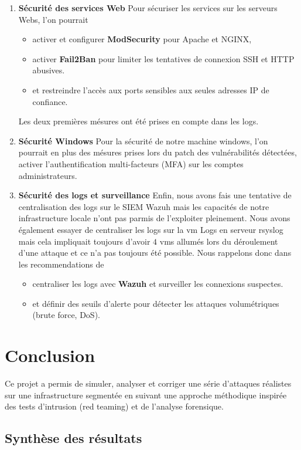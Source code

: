 \documentclass[a4paper,12pt]{report}
\begin{document}
\begin{enumerate}
    \item \textbf{Sécurité des services Web}
    Pour sécuriser les services sur les serveurs Webs, l'on pourrait
    \begin{itemize}
        \item activer et configurer \textbf{ModSecurity} pour Apache et NGINX,
        \item activer \textbf{Fail2Ban} pour limiter les tentatives de connexion SSH et HTTP abusives.
        \item et restreindre l’accès aux ports sensibles aux seules adresses IP de confiance.
    \end{itemize}
Les deux premières mésures ont été prises en compte dans les logs. 
    \item \textbf{Sécurité Windows}
    Pour la sécurité de notre machine windows, l'on pourrait en plus des mésures prises lors du patch des vulnérabilités détectées, activer l’authentification multi-facteurs (MFA) sur les comptes administrateurs.
    

    \item \textbf{Sécurité des logs et surveillance}
    Enfin, nous avons fais une tentative de centralisation des logs sur le SIEM Wazuh mais les capacités de notre infrastructure locale n'ont pas parmis de l'exploiter pleinement. Nous avons également essayer de centraliser les logs sur la vm Logs en serveur rsyslog mais cela impliquait toujours d'avoir $4$ vms allumés lors du déroulement d'une attaque et ce n'a pas toujours été possible. Nous rappelons donc dans les recommendations de 
    \begin{itemize}
        \item centraliser les logs avec \textbf{Wazuh} et surveiller les connexions suspectes.
        \item et définir des seuils d’alerte pour détecter les attaques volumétriques (brute force, DoS).
    \end{itemize}
\end{enumerate}

\chapter{Conclusion}

Ce projet a permis de simuler, analyser et corriger une série d'attaques réalistes sur une infrastructure segmentée en suivant une approche méthodique inspirée des tests d’intrusion (red teaming) et de l’analyse forensique.

\section{Synthèse des résultats}
\end{document}
